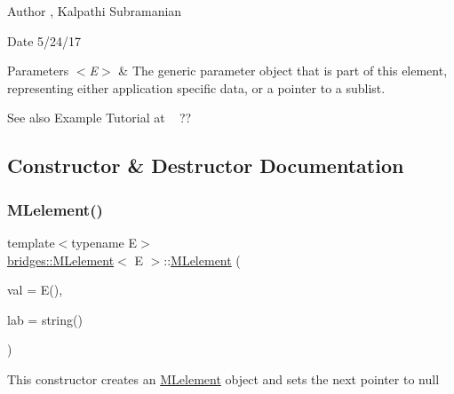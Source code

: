 \begin{DoxyAuthor}{Author}
, Kalpathi Subramanian
\end{DoxyAuthor}
\begin{DoxyDate}{Date}
5/24/17
\end{DoxyDate}

\begin{DoxyParams}{Parameters}
{\em $<$\+E$>$} & The generic parameter object that is part of this element, representing either application specific data, or a pointer to a sublist.\\
\hline
\end{DoxyParams}
\begin{DoxySeeAlso}{See also}
Example Tutorial at ~\newline
 ?? 
\end{DoxySeeAlso}


\subsection{Constructor \& Destructor Documentation}
\mbox{\label{classbridges_1_1_m_lelement_a5d0e64b99abf4d1ad1d2cc89ca28343c}} 
\subsubsection{\texorpdfstring{M\+Lelement()}{MLelement()}\hspace{0.1cm}{\footnotesize\ttfamily [1/3]}}
{\footnotesize\ttfamily template$<$typename E$>$ \\
\mbox{\hyperlink{classbridges_1_1_m_lelement}{bridges\+::\+M\+Lelement}}$<$ E $>$\+::\mbox{\hyperlink{classbridges_1_1_m_lelement}{M\+Lelement}} (\begin{DoxyParamCaption}\item[{const E \&}]{val = {\ttfamily E()},  }\item[{const string \&}]{lab = {\ttfamily string()} }\end{DoxyParamCaption})\hspace{0.3cm}{\ttfamily [inline]}}

This constructor creates an \mbox{\hyperlink{classbridges_1_1_m_lelement}{M\+Lelement}} object and sets the next pointer to null \mbox{\label{classbridges_1_1_m_lelement_ade42b08d96030f1ed5b92c5613d5cedd}} 
